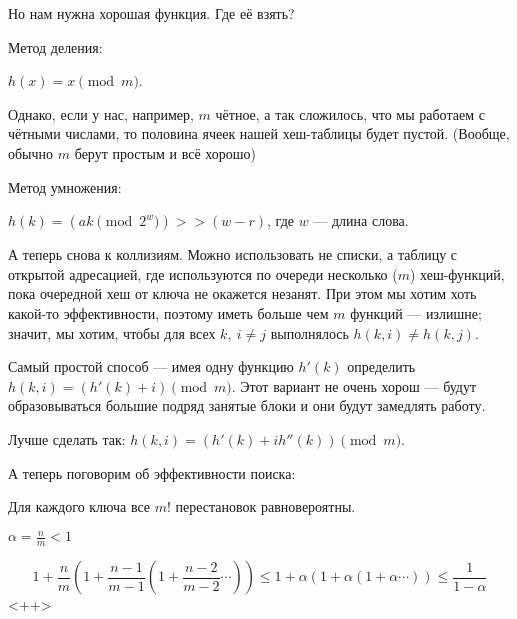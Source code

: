 Но нам нужна хорошая функция. Где её взять?

Метод деления:

$h(x) = x \pmod{m}$.

Однако, если у нас, например, $m$ чётное, а так сложилось, что мы работаем с чётными числами, то половина ячеек нашей хеш-таблицы будет пустой. (Вообще, обычно $m$ берут простым и всё хорошо)

Метод умножения:

$h(k) = (ak\pmod{2^w}) >> (w-r)$, где $w$ --- длина слова.


А теперь снова к коллизиям. Можно использовать не списки, а таблицу с открытой адресацией, где используются по очереди несколько ($m$) хеш-функций, пока очередной хеш от ключа не окажется незанят. При этом мы хотим хоть какой-то эффективности, поэтому иметь больше чем $m$ функций --- излишне; значит, мы хотим, чтобы для всех $k,\ i\neq j$ выполнялось $h(k, i) \neq h(k, j)$.

Самый простой способ --- имея одну функцию $h'(k)$ определить $h(k, i) = (h'(k) + i) \pmod{m}$. Этот вариант не очень хорош --- будут образовываться большие подряд занятые блоки и они будут замедлять работу.

Лучше сделать так: $h(k, i) = (h'(k) + ih''(k)) \pmod{m}$.

А теперь поговорим об эффективности поиска:

Для каждого ключа все $m!$ перестановок равновероятны.

$\alpha = \frac{n}{m} < 1$

\[
    1+\frac{n}{m}\left(1+\frac{n-1}{m-1}\left(1+\frac{n-2}{m-2}\cdots\right)\right) \leqslant 1+\alpha(1+\alpha(1+\alpha\cdots)) \leqslant \frac{1}{1-\alpha}
\]<++>

